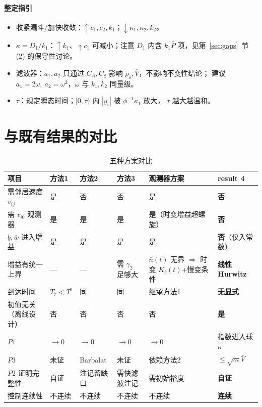 \documentclass[11pt,a4paper]{article}
\newcommand{\ub}{\underline{b}}
\theoremstyle{plain}
\theoremstyle{definition}
\theoremstyle{remark}
\begin{document}
\paragraph{整定指引}
\begin{itemize}
\item 收紧漏斗/加快收敛：$\uparrow c_1,c_2,k_1$；$\downarrow\kappa_1,\kappa_2,k_2$。
\item $\kappa=D_1/k_1$：$\uparrow k_1$、$\uparrow c_1$ 可减小；注意 $D_1$ 内含
$k_1\bar P$ 项，见第~\ref{sec:gaps}~节 (2) 的保守性讨论。
\item 滤波器：$a_1,a_2$ 只通过 $C_A,C_\xi$ 影响 $\rho_s,\bar V$，不影响不变性结论；
建议 $a_1=2\omega,\ a_2=\omega^2$，$\omega$ 与 $k_1,k_2$ 同量级。
\item $\tau$：规定瞬态时间；$[0,\tau)$ 内 $|y_i|$ 被 $\phi^{-1}\kappa_1$ 放大，
$\tau$ 越大越温和。
\end{itemize}

\section{与既有结果的对比}
\begin{table}[H]
\centering
\footnotesize
\caption{五种方案对比}
\setlength{\tabcolsep}{3pt}
\begin{tabular}{p{3.1cm}|p{1.9cm}|p{2.1cm}|p{2.0cm}|p{2.3cm}|p{2.3cm}}
\hline
项目 & 方法1 & 方法2 & 方法3 & 观测器方案 & \textbf{result 4}\\
\hline
需邻居速度 $v_{ij}$ & 是 & 否 & 否 & 是 & \textbf{否}\\
需 $v_{i0}$ 观测器 & 是 & 是 & 是 & 是（时变增益超螺旋） & \textbf{否}\\
$\ub,\bar w$ 进入增益 & 是 & 是 & 是 & 是 & \textbf{否}（仅入常数）\\
增益有统一上界 & --- & --- & 需 $\gamma_2$ 足够大
& $\bar n(t)$ 无界 $\Rightarrow$ 时变 $K_b(t)$+慢变条件 & \textbf{线性 Hurwitz}\\
到达时间 & $T_r<T^{\mathrm r}$ & 同 & 同 & 继承方法1 & \textbf{无显式}\\
初值无关（离线设计） & 否 & 否 & 否 & 否 & \textbf{是}\\
$P1$ & $\to0$ & $\to0$ & $\to0$ & $\to0$ & 指数进入球 $\kappa$\\
$P3$ & 未证 & Barbalat & 未证 & 依赖方法2 & $\le\sqrt m\bar V$\\
$P2$ 证明完整性 & 自证 & 注记留缺口 & 需快滤波注记 & 需初始裕度 & \textbf{自证}\\
控制连续性 & 不连续 & 不连续 & 不连续 & 不连续 & \textbf{连续}\\
\hline
\end{tabular}
\end{table}
\end{document}
